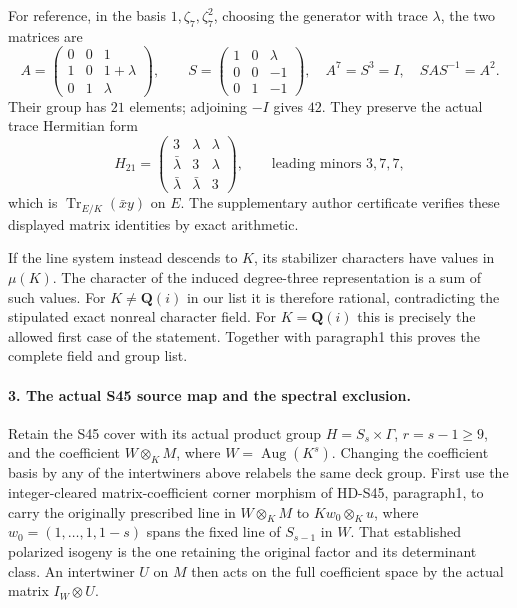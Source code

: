 For reference, in the basis $1,\zeta_7,\zeta_7^2$, choosing
the generator with trace $\lambda$, the two matrices are
\[
 A=\begin{pmatrix}0&0&1\\1&0&1+\lambda\\0&1&\lambda\end{pmatrix},
 \qquad
 S=\begin{pmatrix}1&0&\lambda\\0&0&-1\\0&1&-1\end{pmatrix},
 \quad A^7=S^3=I,\quad SAS^{-1}=A^2.                       \tag{I22.13}
\]
Their group has $21$ elements; adjoining $-I$ gives $42$.
They preserve the actual trace Hermitian form
\[
 H_{21}=\begin{pmatrix}3&\lambda&\lambda\\
 \bar\lambda&3&\lambda\\\bar\lambda&\bar\lambda&3\end{pmatrix},
 \qquad \text{leading minors }3,7,7,                        \tag{I22.14}
\]
which is $\operatorname{Tr}_{E/K}(\bar x y)$ on $E$.
The supplementary author certificate verifies these displayed
matrix identities by exact arithmetic.

If the line system instead descends to $K$, its stabilizer
characters have values in $\mu(K)$. The character of the
induced degree-three representation is a sum of such values.
For $K\ne\mathbf Q(i)$ in our list it is therefore rational,
contradicting the stipulated exact nonreal character field.
For $K=\mathbf Q(i)$ this is precisely the allowed first
case of the statement. Together with paragraph1 this proves
the complete field and group list.

\paragraph{3. The actual S45 source map and the spectral exclusion.}
Retain the S45 cover with its actual product group
$H=S_s\times\Gamma$, $r=s-1\ge9$, and the coefficient
$W\otimes_K M$, where $W=\operatorname{Aug}(K^s)$.
Changing the coefficient basis by any of the intertwiners
above relabels the same deck group. First use the
integer-cleared matrix-coefficient corner morphism of
HD-S45, paragraph1, to carry the originally prescribed
line in $W\otimes_KM$ to $Kw_0\otimes_Ku$, where
$w_0=(1,\ldots,1,1-s)$ spans the fixed line of $S_{s-1}$
in $W$. That established polarized isogeny is the one
retaining the original factor and its determinant class.
An intertwiner $U$ on $M$ then acts on the full coefficient
space by the actual matrix $I_W\otimes U$.

